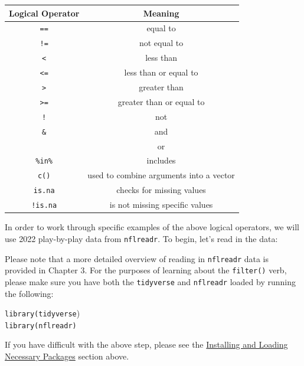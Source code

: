 \documentclass[
  letterpaper,
]{krantz}
\begin{document}
\begin{longtable}[]{@{}cc@{}}
\toprule\noalign{}
Logical Operator & Meaning \\
\midrule\noalign{}
\endhead
\bottomrule\noalign{}
\endlastfoot
\texttt{==} & equal to \\
\texttt{!=} & not equal to \\
\texttt{\textless{}} & less than \\
\texttt{\textless{}=} & less than or equal to \\
\texttt{\textgreater{}} & greater than \\
\texttt{\textgreater{}=} & greater than or equal to \\
\texttt{!} & not \\
\texttt{\&} & and \\
\texttt{\textbar{}} & or \\
\texttt{\%in\%} & includes \\
\texttt{c()} & used to combine arguments into a vector \\
\texttt{is.na} & checks for missing values \\
\texttt{!is.na} & is not missing specific values \\
\end{longtable}

In order to work through specific examples of the above logical
operators, we will use 2022 play-by-play data from \texttt{nflreadr}. To
begin, let's read in the data:

\begin{tcolorbox}[enhanced jigsaw, colback=white, leftrule=.75mm, breakable, colframe=quarto-callout-note-color-frame, bottomtitle=1mm, rightrule=.15mm, left=2mm, opacityback=0, bottomrule=.15mm, arc=.35mm, coltitle=black, colbacktitle=quarto-callout-note-color!10!white, toptitle=1mm, titlerule=0mm, title=\textcolor{quarto-callout-note-color}{\faInfo}\hspace{0.5em}{Note}, toprule=.15mm, opacitybacktitle=0.6]

Please note that a more detailed overview of reading in
\texttt{nflreadr} data is provided in Chapter 3. For the purposes of
learning about the \texttt{filter()} verb, please make sure you have
both the \texttt{tidyverse} and \texttt{nflreadr} loaded by running the
following:

\texttt{library(tidyverse})\\
\texttt{library(nflreadr)}

If you have difficult with the above step, please see the
\protect\hyperlink{installing-and-loading-necessary-packages}{Installing
and Loading Necessary Packages} section above.

\end{tcolorbox}
\end{document}
